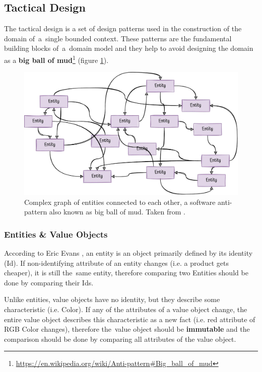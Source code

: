 \subsection{Tactical Design}
\label{ddd:tactical_design}
The tactical design is a set of design patterns used in the construction of the domain of~a~single bounded context. These patterns are the fundamental building blocks of~a~domain model and they help to avoid designing the domain as a \textbf{big ball of mud}\footnote{\url{https://en.wikipedia.org/wiki/Anti-pattern\#Big\_ball\_of\_mud}} (figure \ref{fig:bug_ball_of_mud}).

\begin{figure} [H]
    \centering
    \includegraphics[width=\textwidth]{figures/bbom.png}
    \caption{Complex graph of entities connected to each other, a software anti-pattern also known as big ball of mud. Taken from \cite{albert_llousas:design_ddd_aggregates}.}
    \label{fig:bug_ball_of_mud}
\end{figure}

\subsubsection{Entities \& Value Objects}
\label{ddd:entities_and_value_objects}
According to Eric Evans \cite{eric_evans:ddd}, an entity is an object primarily defined by its identity (Id). If non-identifying attribute of an entity changes (i.e. a product gets cheaper), it is still the~same entity, therefore comparing two Entities should be done by comparing their Ids.

Unlike entities, value objects have no identity, but they describe some characteristic (i.e. Color). If any of the attributes of a value object change, the entire value object describes this characteristic as a new fact (i.e. red attribute of RGB Color changes), therefore the~value object should be \textbf{immutable} and the comparison should be done by comparing all attributes of the value object.

